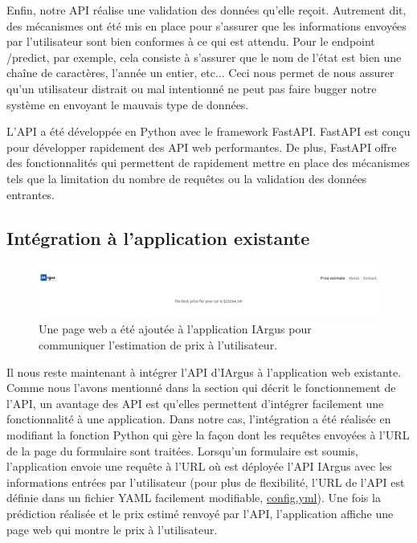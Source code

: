 \documentclass[french]{article}
\begin{document}
    Enfin, notre API réalise une validation des données qu'elle reçoit. Autrement dit, des mécanismes ont été mis en place pour s'assurer que les informations envoyées par l'utilisateur sont bien conformes à ce qui est attendu. Pour le endpoint /predict, par exemple, cela consiste à s'assurer que le nom de l'état est bien une chaîne de caractères, l'année un entier, etc... Ceci nous permet de nous assurer qu'un utilisateur distrait ou mal intentionné ne peut pas faire bugger notre système en envoyant le mauvais type de données.

    L'API a été développée en Python avec le framework FastAPI. FastAPI est conçu pour développer rapidement des API web performantes. De plus, FastAPI offre des fonctionnalités qui permettent de rapidement mettre en place des mécanismes tels que la limitation du nombre de requêtes ou la validation des données entrantes.

    \subsection{Intégration à l'application existante}

    \begin{figure}[h!]
        \includegraphics[width=12cm]{prediction_result}
        \centering
        \caption{Une page web a été ajoutée à l'application IArgus pour communiquer l'estimation de prix à l'utilisateur.}
    \end{figure}

    Il nous reste maintenant à intégrer l'API d'IArgus à l'application web existante. Comme nous l'avons mentionné dans la section qui décrit le fonctionnement de l'API, un avantage des API est qu'elles permettent d'intégrer facilement une fonctionnalité à une application. Dans notre cas, l'intégration a été réalisée en modifiant la fonction Python qui gère la façon dont les requêtes envoyées à l'URL de la page du formulaire sont traitées. Lorsqu'un formulaire est soumis, l'application envoie une requête à l'URL où est déployée l'API IArgus avec les informations entrées par l'utilisateur (pour plus de flexibilité, l'URL de l'API est définie dans un fichier YAML facilement modifiable, \href{https://github.com/vinpap/iargus_app/blob/4b5f8b114a623f38f883587913b486281657ead5/config.yml}{config.yml}). Une fois la prédiction réalisée et le prix estimé renvoyé par l'API, l'application affiche une page web qui montre le prix à l'utilisateur.
\end{document}
